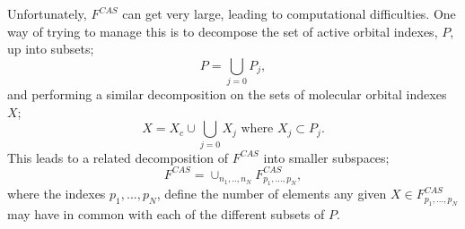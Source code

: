 \documentclass[12pt]{article}
\begin{document}
\noindent Unfortunately, $F^{CAS}$ can get very large, leading to computational difficulties. 
One way of trying to manage this is to decompose the set of active orbital indexes, $P$, up into subsets;
\begin{equation}
P = \bigcup\limits_{j=0} P_{j}, 
\end{equation}
and performing a similar decomposition on the sets of molecular orbital indexes $X$;
\begin{equation}
X = X_{c} \cup  \bigcup\limits_{j=0} X_{j} \text{ \ \ \ \ \ where \ \ \ \ \ } X_{j} \subset P_{j}. 
\end{equation}
This leads to a related decomposition of $F^{CAS}$ into smaller subspaces;
\begin{equation*}
F^{CAS} = \cup_{n_{1},..,n_{N}} F^{CAS}_{p_{1},...,p_{N}},
\end{equation*}
where the indexes ${p_{1},...,p_{N}}$, define the number of elements any given $X \in F^{CAS}_{p_{1},...,p_{N}}$
may have in common with each of the different subsets of $P$.\\
\end{document}
